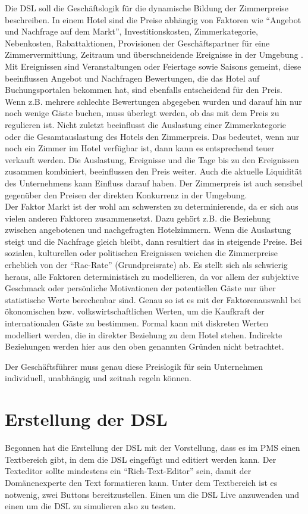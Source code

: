 \documentclass[11pt,english,ngerman, headsepline]{scrreprt}
\begin{document}
Die DSL soll die Geschäftslogik für die dynamische Bildung der Zimmerpreise
beschreiben. In einem Hotel sind die Preise abhängig von Faktoren wie
``Angebot und Nachfrage auf dem Markt'', Investitionskosten, Zimmerkategorie,
Nebenkosten, Rabattaktionen, Provisionen der Geschäftspartner für eine
Zimmervermittlung, Zeitraum und überschneidende Ereignisse in der Umgebung
\cite[S. 44]{hahn1993tourismuspsychologie}. Mit Ereignissen sind Veranstaltungen
oder Feiertage sowie Saisons gemeint, diese beeinflussen Angebot und Nachfragen Bewertungen, die
das Hotel auf Buchungsportalen bekommen hat, sind ebenfalls entscheidend für den Preis. Wenn
z.B. mehrere schlechte Bewertungen abgegeben wurden und darauf hin nur noch wenige
Gäste buchen, muss überlegt werden, ob das mit dem Preis zu regulieren ist.
Nicht zuletzt beeinflusst die Auslastung einer Zimmerkategorie oder die
Gesamtauslastung des Hotels den Zimmerpreis. Das bedeutet, wenn nur noch ein
Zimmer im Hotel verfügbar ist, dann kann es entsprechend teuer verkauft werden.
Die Auslastung, Ereignisse und die Tage bis zu den Ereignissen zusammen
kombiniert, beeinflussen den Preis weiter. Auch die aktuelle Liquidität des
Unternehmens kann Einfluss darauf haben. Der Zimmerpreis ist auch sensibel
gegenüber den Preisen der direkten Konkurrenz in der Umgebung. \\
Der Faktor Markt ist der wohl am schwersten zu determinierende, da er sich aus
vielen anderen Faktoren zusammensetzt. Dazu gehört z.B. die Beziehung zwischen
angebotenen und nachgefragten Hotelzimmern. Wenn die Auslastung steigt und die
Nachfrage gleich bleibt, dann resultiert das in steigende Preise.
Bei sozialen, kulturellen oder politischen Ereignissen weichen die Zimmerpreise
erheblich von der ``Rac-Rate'' (Grundpreisrate) ab.
Es stellt sich als schwierig heraus, alle Faktoren deterministisch zu
modellieren, da vor allem der subjektive Geschmack oder persönliche Motivationen
der potentiellen Gäste nur über statistische Werte berechenbar sind. Genau so
ist es mit der Faktorenauswahl bei ökonomischen bzw. volkswirtschaftlichen
Werten, um die Kaufkraft der internationalen Gäste zu bestimmen.
Formal kann mit diskreten Werten modelliert werden, die in direkter Beziehung zu
dem Hotel stehen. Indirekte Beziehungen werden hier aus den oben genannten
Gründen nicht betrachtet.

Der Geschäftsführer muss genau diese Preislogik für
sein Unternehmen individuell, unabhängig und zeitnah regeln können.

\section{Erstellung der DSL}\label{erstellungDSL}
Begonnen hat die Erstellung der DSL mit der Vorstellung, dass es im PMS einen
Textbereich gibt, in dem die DSL eingefügt und editiert werden kann.
Der Texteditor sollte mindestens ein ``Rich-Text-Editor'' sein, damit der
Domänenexperte den Text formatieren kann.
Unter dem Textbereich ist es notwenig, zwei Buttons bereitzustellen. Einen um
die DSL Live anzuwenden und einen um die DSL zu simulieren also zu testen.
\end{document}

